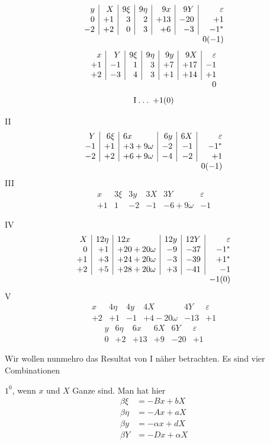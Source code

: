 \[
\begin{array}{r|r|r|r|r|r|r}
y&X&9\xi&9\eta&9x&9Y&\varepsilon\\
0&+1&3&2&+13&-20&+1\\
-2&+2&0&3&+6&-3&-1^{*}\\
\multicolumn{6}{c}{}&0(-1)
\end{array}
\]
\[
\begin{array}{r|r|r|r|r|r|r}
x&Y&9\xi&9\eta&9y&9X&\varepsilon\\
+1&-1&1&3&+7&+17&-1\\
+2&-3&4&3&+1&+14&+1\\
\multicolumn{6}{c}{}&0
\end{array}
\]
\[
\mathrm{I}\mathbin{.}\mathbin{.}\mathbin{.}\;+1(0)
\]

\noindent II
\[
\begin{array}{r|r|l|r|r|r}
Y&6\xi&6x&6y&6X&\varepsilon\\
-1&+1&+3+9\omega&-2&-1&-1^{*}\\
-2&+2&+6+9\omega&-4&-2&+1\\
\multicolumn{5}{c}{}&0(-1)
\end{array}
\]
\noindent III
\[
\begin{array}{r|r|r|r|l|r}
x&3\xi&3y&3X&3Y&\varepsilon\\
+1&1&-2&-1&-6+9\omega&-1
\end{array}
\]

\noindent IV
\[
\begin{array}{r|r|l|r|r|r}
X&12\eta&12x&12y&12Y&\varepsilon\\
0&+1&+20+20\omega&-9&-37&-1^{*}\\
+1&+3&+24+20\omega&-3&-39&+1^{*}\\
+2&+5&+28+20\omega&+3&-41&-1\\
\multicolumn{5}{c}{}&-1(0)
\end{array}
\]
\noindent V
\[
\begin{array}{r|r|r|l|r|r}
x&4\eta&4y&4X&4Y&\varepsilon\\
+2&+1&-1&+4-20\omega&-13&+1
\end{array}
\]
\[
\begin{array}{r|r|r|r|r|r}
y&6\eta&6x&6X&6Y&\varepsilon\\
0&+2&+13&+9&-20&+1
\end{array}
\]

%
Wir wollen nunmehro das Resultat von I näher betrachten. Es sind vier Combinationen\par
\noindent $1^0$, wenn $x$ und $X$ Ganze sind. Man hat hier
\[
\begin{aligned}
\beta\xi&=-Bx+bX\\
\beta\eta&=-Ax+aX\\
\beta y&=-\alpha x+dX\\
\beta Y&=-Dx+\alpha X
\end{aligned}
\]

